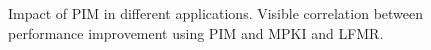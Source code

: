\begin{figure}[!th]
  
   \vspace{-.05in}
   \caption{Impact of PIM in different applications. Visible correlation between performance improvement using PIM and MPKI and LFMR.
   }
 \vspace{-.1in}
 \label{fig:expr:pim}
 \vspace{-1em}
\end{figure}



%
%
%
%  
%
%
%
%








